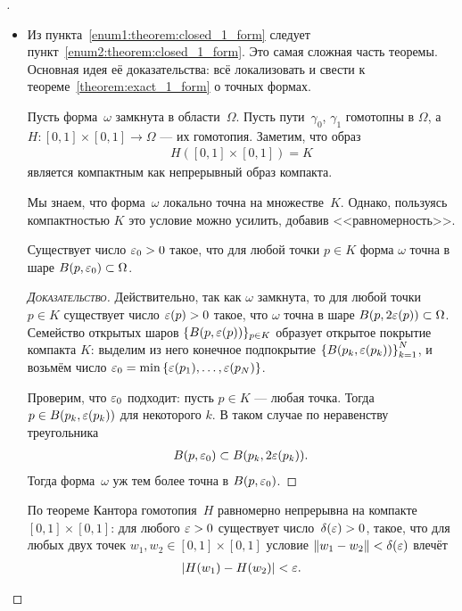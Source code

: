 \documentclass[../complex-analysis.tex]{subfiles}
\begin{document}
\begin{proof}[]\
 \begin{itemize}
  \item Из пункта~\ref{enum1:theorem:closed_1_form} следует пункт~\ref{enum2:theorem:closed_1_form}. Это самая сложная часть теоремы. Основная идея её доказательства: всё  локализовать и свести к теореме~\ref{theorem:exact_1_form} о точных формах.

   Пусть форма~$\omega$ замкнута в области~$\Omega$. Пусть пути~$\gamma_0$, $\gamma_1$ гомотопны в $\Omega$, а $H \colon [0,1] \times [0,1] \to \Omega$ --- их гомотопия. Заметим, что образ
   \begin{align*}
    H([0,1] \times [0,1]) = K
   \end{align*}  является компактным как непрерывный образ компакта.

   Мы знаем, что форма~$ \omega $ локально точна на множестве~$ K $. Однако, пользуясь компактностью $ K $ это условие можно усилить, добавив <<равномерность>>.
   \begin{prop}
    \label{prop:eps_0:theorem:closed_1_form}
    Существует число $\varepsilon_0 > 0$ такое, что для любой точки $p \in K$ форма $\omega$ точна в шаре $B(p,\varepsilon_0) \subset \Omega$. 
   \end{prop}
   \begin{proof}[\normalfont\textsc{Доказательство}]
    Действительно, так как $\omega$ замкнута, то для любой точки $p \in K$ существует число $\varepsilon(p) > 0$ такое, что $\omega$ точна в шаре $B(p,2\varepsilon(p))\subset\Omega$. Семейство открытых шаров $\{B(p,\varepsilon(p))\}_{p \in K}$ образует открытое покрытие компакта $K$:  выделим из него конечное подпокрытие $\left\{ B(p_k, \varepsilon(p_k)) \right\}_{k=1}^{N}$, и возьмём число $\varepsilon_0 = \min \left\{ \varepsilon(p_1), \ldots, \varepsilon(p_N) \right\}$.

    Проверим, что $\varepsilon_0$ подходит: пусть $p \in K$ --- любая точка. Тогда $p \in B(p_k,\varepsilon(p_k))$ для некоторого $k$. В таком случае по неравенству треугольника
    \begin{align*}
     B(p, \varepsilon_0)\subset B(p_k,2\varepsilon(p_k)).
    \end{align*} Тогда форма~$\omega$ уж тем более точна в $B(p,\varepsilon_0)$.
   \end{proof}

   По теореме Кантора гомотопия~$H$ равномерно непрерывна на компакте~$[0,1]\times[0,1]$: для любого $\varepsilon > 0$ существует число~$\delta(\varepsilon) > 0$, такое, что для любых двух точек $w_1,w_2 \in [0,1] \times [0,1]$ условие $\left\| w_1 - w_2 \right\| < \delta(\varepsilon)$ влечёт
   \begin{align*}
    \left| H(w_1)-H(w_2) \right| < \varepsilon.
   \end{align*}


\end{itemize}
\end{proof}
\end{document}
